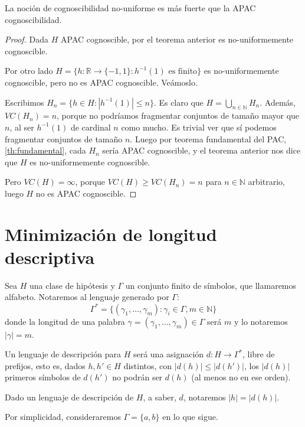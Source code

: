 \begin{corollary}
 La noción de cognoscibilidad no-uniforme es más fuerte que la APAC cognoscibilidad.
\end{corollary}
\begin{proof}
 Dada $H$ APAC cognoscible, por el teorema anterior es no-uniformemente cognoscible.
 
 Por otro lado $H = \{h:\mathbb{R} \rightarrow \{-1,1\} : h^{-1}(1) \textrm{ es finito}\}$ es no-uniformemente cognoscible,
 pero no es APAC cognoscible. Veámoslo.
 
 Escribimos $H_n = \{h\in H: |h^{-1}(1)| \le n\}$. Es claro que $H=\bigcup_{n\in \mathbb{N}} H_n$. Además, $VC(H_n) = n$,
 porque no podríamos fragmentar conjuntos de tamaño mayor que $n$, al ser $h^{-1}(1)$ de cardinal $n$ como mucho. Es trivial
 ver que sí podemos fragmentar conjuntos de tamaño $n$. Luego por teorema fundamental del PAC, \ref{th:fundamental}, 
 cada $H_n$ sería APAC cognoscible, y el teorema anterior nos dice que $H$ es no-uniformemente cognoscible.
 
 Pero $VC(H) = \infty$, porque $VC(H) \ge VC(H_n) = n$ para $n\in \mathbb{N}$ arbitrario, luego $H$ no es APAC cognoscible.
\end{proof}
  
\section{Minimización de longitud descriptiva}
\begin{definition}
 Sea $H$ una clase de hipótesis y $\Gamma$ un conjunto finito de símbolos, que llamaremos alfabeto. Notaremos 
 al lenguaje generado por $\Gamma$:
 \[
   \Gamma^{\ast} = \{(\gamma_1, \ldots, \gamma_m): \gamma_i \in \Gamma, m\in \mathbb{N}\}
 \]
 donde la longitud de una palabra $\gamma = (\gamma_1, \ldots, \gamma_m) \in \Gamma$ será $m$ y lo notaremos $|\gamma| = m$.
 
 Un lenguaje de descripción para $H$ será una asignación $d: H \rightarrow \Gamma^{\ast}$, libre de prefijos,
 esto es, dados $h,h'\in H$ distintos, con $|d(h)| \le |d(h')|$, los $|d(h)|$ primeros símbolos de $d(h')$
 no podrán ser $d(h)$ (al menos no en ese orden).
 
 Dado un lenguaje de descripción de $H$, a saber, $d$, notaremos $|h| = |d(h)|$.
\end{definition}

Por simplicidad, consideraremos $\Gamma = \{a,b\}$ en lo que sigue.

